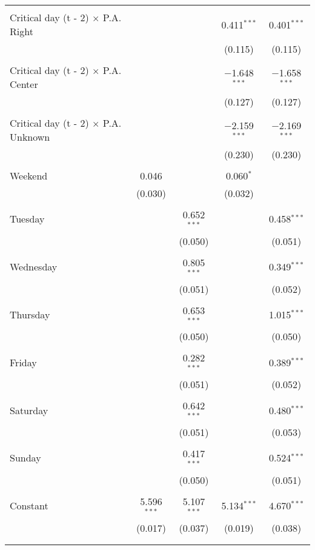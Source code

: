 \documentclass[
]{article}
\begin{document}
\begin{table}[!htbp]
{\begin{tabular}{@{\extracolsep{5pt}}lcccc}
  & & & & \\ 
 Critical day (t - 2) $\times$ P.A. Right &  &  & 0.411$^{***}$ & 0.401$^{***}$ \\ 
  &  &  & (0.115) & (0.115) \\ 
  & & & & \\ 
 Critical day (t - 2) $\times$ P.A. Center &  &  & $-$1.648$^{***}$ & $-$1.658$^{***}$ \\ 
  &  &  & (0.127) & (0.127) \\ 
  & & & & \\ 
 Critical day (t - 2) $\times$ P.A. Unknown &  &  & $-$2.159$^{***}$ & $-$2.169$^{***}$ \\ 
  &  &  & (0.230) & (0.230) \\ 
  & & & & \\ 
 Weekend & 0.046 &  & 0.060$^{*}$ &  \\ 
  & (0.030) &  & (0.032) &  \\ 
  & & & & \\ 
 Tuesday &  & 0.652$^{***}$ &  & 0.458$^{***}$ \\ 
  &  & (0.050) &  & (0.051) \\ 
  & & & & \\ 
 Wednesday &  & 0.805$^{***}$ &  & 0.349$^{***}$ \\ 
  &  & (0.051) &  & (0.052) \\ 
  & & & & \\ 
 Thursday &  & 0.653$^{***}$ &  & 1.015$^{***}$ \\ 
  &  & (0.050) &  & (0.050) \\ 
  & & & & \\ 
 Friday &  & 0.282$^{***}$ &  & 0.389$^{***}$ \\ 
  &  & (0.051) &  & (0.052) \\ 
  & & & & \\ 
 Saturday &  & 0.642$^{***}$ &  & 0.480$^{***}$ \\ 
  &  & (0.051) &  & (0.053) \\ 
  & & & & \\ 
 Sunday &  & 0.417$^{***}$ &  & 0.524$^{***}$ \\ 
  &  & (0.050) &  & (0.051) \\ 
  & & & & \\ 
 Constant & 5.596$^{***}$ & 5.107$^{***}$ & 5.134$^{***}$ & 4.670$^{***}$ \\ 
  & (0.017) & (0.037) & (0.019) & (0.038) \\ 
  & & & & \\ 
\hline \\[-1.8ex] 

\end{tabular}}
\end{table}
\end{document}
